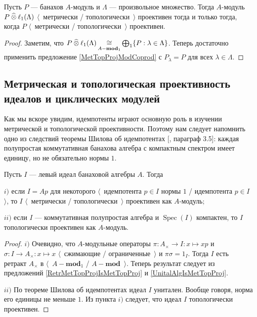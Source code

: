 \begin{corollary}\label{MetTopProjTensProdWithl1} Пусть $P$ --- банахов $A$-модуль и $\Lambda$ --- произвольное множество. Тогда $A$-модуль $P\mathbin{\widehat{\otimes}} \ell_1(\Lambda)$ $\langle$~метрически / топологически~$\rangle$ проективен тогда и только тогда, когда $P$ $\langle$~метрически / топологически~$\rangle$ проективен.
\end{corollary}
\begin{proof} Заметим, что $P\mathbin{\widehat{\otimes}} \ell_1(\Lambda)\mathop{\mathbin{\cong}}\limits_{A-\mathbf{mod}_1}\bigoplus_1\{P:\lambda\in\Lambda\}$. Теперь достаточно применить предложение \ref{MetTopProjModCoprod} с $P_\lambda=P$ для всех $\lambda\in\Lambda$.
\end{proof}


\subsection{Метрическая и топологическая проективность идеалов и циклических модулей}
\label{SubSectionMetricAndTopologicalProjectivityOfIdealsAndCyclicModules}

Как мы вскоре увидим, идемпотенты играют основную роль в изучении метрической и топологической проективности. Поэтому нам следует напомнить одно из следствий теоремы Шилова об идемпотентах [\cite{KaniBanAlg}, параграф 3.5]: каждая полупростая коммутативная банахова алгебра с компактным спектром имеет единицу, но не обязательно нормы $1$. 

\begin{proposition}\label{UnIdeallIsMetTopProj}
Пусть $I$ --- левый идеал банаховой алгебры $A$. Тогда

$i)$ если $I=Ap$ для некоторого $\langle$~идемпотента $p\in I$ нормы $1$ / идемпотента $p\in I$~$\rangle$, то $I$ $\langle$~метрически / топологически~$\rangle$ проективен как $A$-модуль;

$ii)$ если $I$ --- коммутативная полупростая алгебра и $\operatorname{Spec}(I)$ компактен, то $I$ топологически проективен как $A$-модуль.
\end{proposition}
\begin{proof} 
$i)$ Очевидно, что $A$-модульные операторы $\pi:A_\times\to I:x\mapsto xp$ и $\sigma:I\to A_\times:x\mapsto x$ $\langle$~сжимающие / ограниченные~$\rangle$ и $\pi\sigma=1_I$. Тогда $I$ есть ретракт $A_\times$ в $\langle$~$A-\mathbf{mod}_1$ / $A-\mathbf{mod}$~$\rangle$. Теперь результат следует из предложений \ref{RetrMetTopProjIsMetTopProj} и \ref{UnitalAlgIsMetTopProj}.

$ii)$ По теореме Шилова об идемпотентах идеал $I$ унитален. Вообще говоря, норма его единицы не меньше $1$. Из пункта $i)$ следует, что идеал $I$ топологически проективен.
\end{proof}

